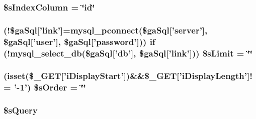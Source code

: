 \hypertarget{details__col_8php_a8bddf0b8ded9777b9068de5fa9e217a2}{
\subsubsection[{\$s\+Index\+Column}]{\setlength{\rightskip}{0pt plus 5cm}\$s\+Index\+Column = \char`\"{}id\char`\"{}}}\label{details__col_8php_a8bddf0b8ded9777b9068de5fa9e217a2}
\hypertarget{details__col_8php_a867f070c3b4e597275c622aac60de587}{
\subsubsection[{\$s\+Limit}]{ (!\$ga\+Sql\mbox{[}'link'\mbox{]}=mysql\+\_\+pconnect(\$ga\+Sql\mbox{[}'server'\mbox{]}, \$ga\+Sql\mbox{[}'user'\mbox{]}, \$ga\+Sql\mbox{[}'password'\mbox{]})) {\bf if} (!mysql\+\_\+select\+\_\+db(\$ga\+Sql\mbox{[}'db'\mbox{]}, \$ga\+Sql\mbox{[}'link'\mbox{]})) \$s\+Limit = \char`\"{}\char`\"{}}}\label{details__col_8php_a867f070c3b4e597275c622aac60de587}
\hypertarget{details__col_8php_a4943002271f61f76fd87176bc8b923bf}{
\subsubsection[{\$s\+Order}]{ (isset(\$\+\_\+\+G\+E\+T\mbox{[}'i\+Display\+Start'\mbox{]})\&\&\$\+\_\+\+G\+E\+T\mbox{[}'i\+Display\+Length'\mbox{]}!= '-\/1') \$s\+Order = \char`\"{}\char`\"{}}}\label{details__col_8php_a4943002271f61f76fd87176bc8b923bf}
\hypertarget{details__col_8php_a5175d5486118502db3f7aa1ccf7029cc}{
\subsubsection[{\$s\+Query}]{\setlength{\rightskip}{0pt plus 5cm}\$s\+Query}}\label{details__col_8php_a5175d5486118502db3f7aa1ccf7029cc}
